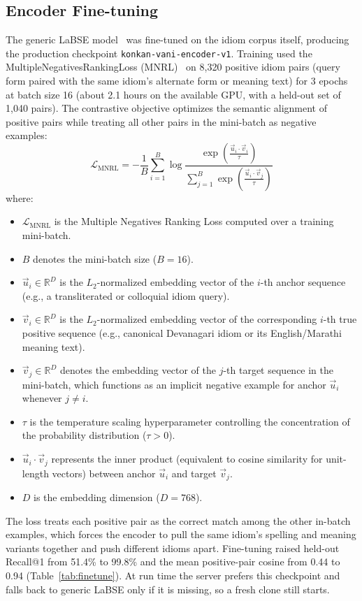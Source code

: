 \documentclass[12pt,a4paper]{article}
\begin{document}
\subsection{Encoder Fine-tuning}
The generic LaBSE model~\cite{labse} was fine-tuned on the idiom corpus itself, producing the production checkpoint \texttt{konkan-vani-encoder-v1}. Training used the MultipleNegativesRankingLoss (MNRL)~\cite{henderson,sbert} on 8,320 positive idiom pairs (query form paired with the same idiom's alternate form or meaning text) for 3 epochs at batch size 16 (about 2.1 hours on the available GPU, with a held-out set of 1,040 pairs). The contrastive objective optimizes the semantic alignment of positive pairs while treating all other pairs in the mini-batch as negative examples:
\begin{equation}
\label{eq:mnrl}
\mathcal{L}_{\mathrm{MNRL}} = -\frac{1}{B} \sum_{i=1}^{B} \log \frac{\exp\left(\frac{\vec{u}_i \cdot \vec{v}_i}{\tau}\right)}{\sum_{j=1}^{B} \exp\left(\frac{\vec{u}_i \cdot \vec{v}_j}{\tau}\right)}
\end{equation}
where:
\begin{itemize}
  \item $\mathcal{L}_{\mathrm{MNRL}}$ is the Multiple Negatives Ranking Loss computed over a training mini-batch.
  \item $B$ denotes the mini-batch size ($B = 16$).
  \item $\vec{u}_i \in \mathbb{R}^D$ is the $L_2$-normalized embedding vector of the $i$-th anchor sequence (e.g., a transliterated or colloquial idiom query).
  \item $\vec{v}_i \in \mathbb{R}^D$ is the $L_2$-normalized embedding vector of the corresponding $i$-th true positive sequence (e.g., canonical Devanagari idiom or its English/Marathi meaning text).
  \item $\vec{v}_j \in \mathbb{R}^D$ denotes the embedding vector of the $j$-th target sequence in the mini-batch, which functions as an implicit negative example for anchor $\vec{u}_i$ whenever $j \neq i$.
  \item $\tau$ is the temperature scaling hyperparameter controlling the concentration of the probability distribution ($\tau > 0$).
  \item $\vec{u}_i \cdot \vec{v}_j$ represents the inner product (equivalent to cosine similarity for unit-length vectors) between anchor $\vec{u}_i$ and target $\vec{v}_j$.
  \item $D$ is the embedding dimension ($D = 768$).
\end{itemize}
The loss treats each positive pair as the correct match among the other in-batch examples, which forces the encoder to pull the same idiom's spelling and meaning variants together and push different idioms apart. Fine-tuning raised held-out Recall@1 from 51.4\% to 99.8\% and the mean positive-pair cosine from 0.44 to 0.94 (Table~\ref{tab:finetune}). At run time the server prefers this checkpoint and falls back to generic LaBSE only if it is missing, so a fresh clone still starts.
\end{document}
